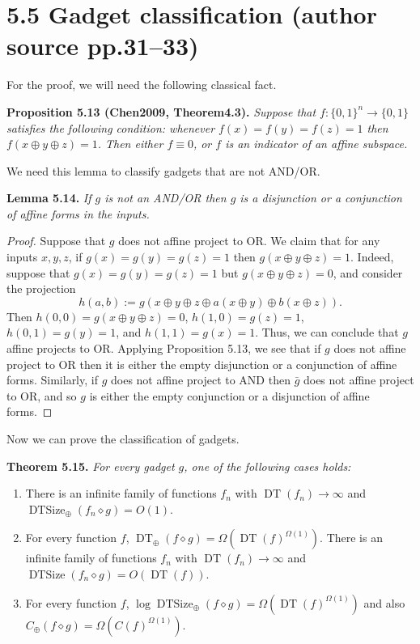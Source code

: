 \documentclass[10pt,a4paper]{article}
\newcommand{\bits}{\{0,1\}}
\newcommand{\DT}{\operatorname{DT}}
\newcommand{\DTSize}{\operatorname{DTSize}}
\newcommand{\comp}{\diamond}
\newenvironment{originalresult}[1]{\par\medskip\noindent\textbf{#1.}\itshape}{\par\medskip}
\begin{document}
\section*{5.5 Gadget classification (author source pp.31--33)}
For the proof, we will need the following classical fact.
\begin{originalresult}{Proposition 5.13 (Chen2009, Theorem4.3)}
Suppose that $f:\bits^n\to\bits$ satisfies the following condition: whenever $f(x)=f(y)=f(z)=1$ then $f(x\oplus y\oplus z)=1$. Then either $f\equiv0$, or $f$ is an indicator of an affine subspace.
\end{originalresult}
We need this lemma to classify gadgets that are not AND/OR.
\begin{originalresult}{Lemma 5.14}
If $g$ is not an AND/OR then $g$ is a disjunction or a conjunction of affine forms in the inputs.
\end{originalresult}
\begin{proof}
Suppose that $g$ does not affine project to OR. We claim that for any inputs $x,y,z$, if $g(x)=g(y)=g(z)=1$ then $g(x\oplus y\oplus z)=1$. Indeed, suppose that $g(x)=g(y)=g(z)=1$ but $g(x\oplus y\oplus z)=0$, and consider the projection
\[h(a,b):=g(x\oplus y\oplus z\oplus a(x\oplus y)\oplus b(x\oplus z)).\]
Then $h(0,0)=g(x\oplus y\oplus z)=0$, $h(1,0)=g(z)=1$, $h(0,1)=g(y)=1$, and $h(1,1)=g(x)=1$. Thus, we can conclude that $g$ affine projects to OR.
Applying Proposition 5.13, we see that if $g$ does not affine project to OR then it is either the empty disjunction or a conjunction of affine forms. Similarly, if $g$ does not affine project to AND then $\bar g$ does not affine project to OR, and so $g$ is either the empty conjunction or a disjunction of affine forms.
\end{proof}
Now we can prove the classification of gadgets.

\begin{originalresult}{Theorem 5.15}
For every gadget $g$, one of the following cases holds:
\begin{enumerate}
\item[(i)] There is an infinite family of functions $f_n$ with $\DT(f_n)\to\infty$ and $\DTSize_\oplus(f_n\comp g)=O(1)$.
\item[(ii)] For every function $f$, $\DT_\oplus(f\comp g)=\Omega(\DT(f)^{\Omega(1)})$. There is an infinite family of functions $f_n$ with $\DT(f_n)\to\infty$ and $\DTSize(f_n\comp g)=O(\DT(f))$.
\item[(iii)] For every function $f$, $\log\DTSize_\oplus(f\comp g)=\Omega(\DT(f)^{\Omega(1)})$ and also $C_\oplus(f\comp g)=\Omega(C(f)^{\Omega(1)})$.
\end{enumerate}
\end{originalresult}
\end{document}

